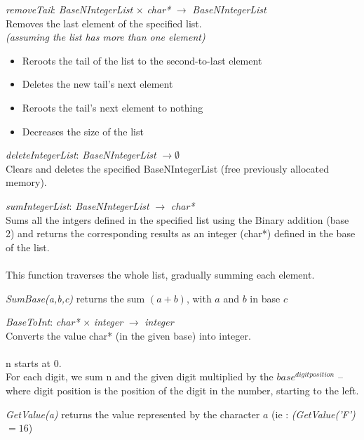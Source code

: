 \documentclass[book, backcover, english, nodocumentinfo]{upmethodology-document}
\begin{document}
		\begin{minipage}{\linewidth}
			\textit{removeTail}: \textit{BaseNIntegerList} $\times$ \textit{char*} $\rightarrow$ \textit{BaseNIntegerList}\\
			Removes the last element of the specified list.\\
			\ov \textit{ (assuming the list has more than one element)}
			\begin{itemize}
				\item Reroots the tail of the list to the second-to-last element
				\item Deletes the new tail's next element
				\item Reroots the tail's next element to nothing
				\item Decreases the size of the list
			\end{itemize}
			\label{algo:BNIL-RemoveTail}
			
		\end{minipage}
		\nxtalgo{}

		\begin{minipage}{\linewidth}
			\textit{deleteIntegerList}: \textit{BaseNIntegerList} $\rightarrow \emptyset$\\
			Clears and deletes the specified BaseNIntegerList (free previously allocated memory).\\
			\label{algo:BNIL-DeleteIntegerList}
			
		\end{minipage}
		\nxtalgo{}

		\begin{minipage}{\linewidth}
			\textit{sumIntegerList}: \textit{BaseNIntegerList} $\rightarrow$ \textit{char*}\\
			Sums all the intgers defined in the specified list using the Binary addition (base 2) and returns the corresponding results as an integer (char*) defined in the base of the list.\\
			\ov\\
			This function traverses the whole list, gradually summing each element.
			\label{algo:BNIL-SumIntegerList}
			
			\textit{SumBase(a,b,c)} returns the sum $(a+b)$, with $a$ and $b$ in base $c$
		\end{minipage}
		\nxtalgo{}

		\begin{minipage}{\linewidth}
			\textit{BaseToInt}: \textit{char*} $\times$ \textit{integer} $\rightarrow$ \textit{integer}\\
			Converts the value char* (in the given base) into integer.\\
			\ov\\
			n starts at 0.\\
			For each digit, we sum n and the given digit multiplied by the $base^{digit position}$ -- where digit position is the position of the digit in the number, starting to the left.
			\label{algo:BNIL-BaseToInt}
			
			\textit{GetValue(a)} returns the value represented by the character $a$
			(ie : \textit{(GetValue('F')} $= 16$)
		\end{minipage}
		\nxtalgo{}
\end{document}
